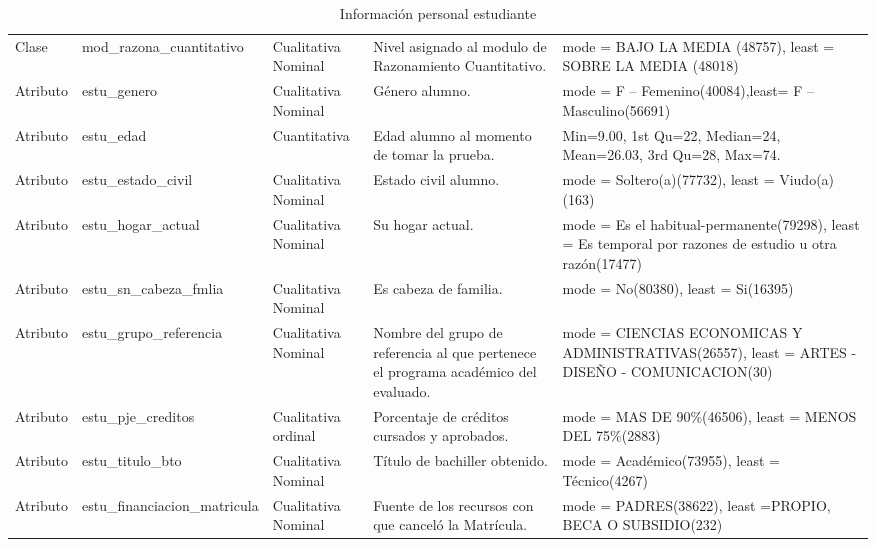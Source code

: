 \begin{table*}[ht]
\caption{Información personal estudiante}
\label{table:estu}
\begin{tabular}{|>{\centering\arraybackslash}m{2cm}|>{\arraybackslash}m{4cm}|>{\arraybackslash}m{2cm}|>{\arraybackslash}m{3cm}|>{\arraybackslash}m{4cm}| }
\hline
  \rowcolor{blue!55} 
   \multicolumn{1}{|c|}{Atributo/Clase} & \multicolumn{1}{c|}{Nombre} & \multicolumn{1}{c|}{Tipo} & 
   \multicolumn{1}{c|}{Descripción} & \multicolumn{1}{c|}{Estadística} \\ \hline
    Clase & mod\_razona\_cuantitativo & Cualitativa Nominal & Nivel asignado al modulo de Razonamiento Cuantitativo. & mode = BAJO LA MEDIA (48757),
    least = SOBRE LA MEDIA  (48018) \\ \hline
    Atributo & estu\_genero & Cualitativa Nominal & Género alumno. & mode = F – Femenino(40084),least= F – Masculino(56691) \\ \hline
    Atributo & estu\_edad & Cuantitativa & Edad alumno al momento de tomar la prueba. & Min=9.00, 1st Qu=22, Median=24,    Mean=26.03, 3rd Qu=28, Max=74. \\ \hline
    Atributo & estu\_estado\_civil & Cualitativa Nominal & Estado civil alumno. & mode = Soltero(a)(77732), least = Viudo(a)(163) \\ \hline
    Atributo & estu\_hogar\_actual & Cualitativa Nominal & Su hogar actual. & mode = Es el habitual-permanente(79298),
    least = Es temporal por razones de estudio u otra razón(17477) \\ \hline
    Atributo & estu\_sn\_cabeza\_fmlia & Cualitativa Nominal & Es cabeza de familia. & mode = No(80380), least = Si(16395) \\ \hline
    Atributo & estu\_grupo\_referencia & Cualitativa Nominal & Nombre del grupo de referencia al que pertenece el programa
    académico del evaluado. & mode = CIENCIAS ECONOMICAS Y ADMINISTRATIVAS(26557),
    least = ARTES - DISEÑO - COMUNICACION(30) \\ \hline
    Atributo & estu\_pje\_creditos & Cualitativa ordinal & Porcentaje de créditos cursados y aprobados. & mode = MAS DE 90\%(46506), least = MENOS DEL 75\%(2883)  \\ \hline
    Atributo & estu\_titulo\_bto & Cualitativa Nominal & Título de bachiller obtenido. & mode = Académico(73955), least = Técnico(4267) \\ \hline
    Atributo & estu\_financiacion\_matricula & Cualitativa Nominal & Fuente de los recursos con que canceló la Matrícula. & mode = PADRES(38622), least =PROPIO, BECA O SUBSIDIO(232) \\ \hline

\end{tabular}
\end{table*}
